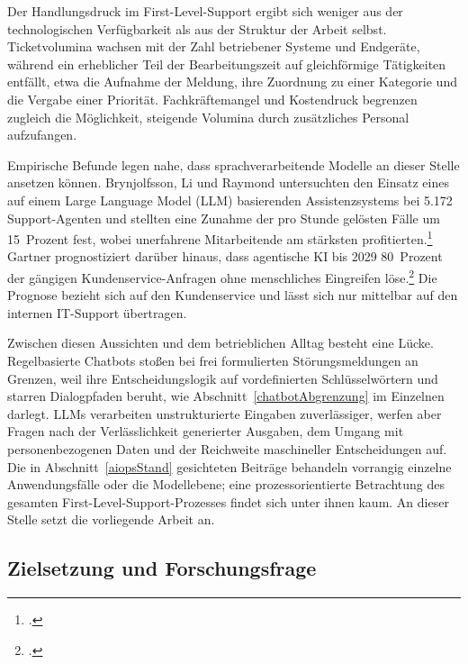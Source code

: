 Der Handlungsdruck im First-Level-Support ergibt sich weniger aus der technologischen Verf\"ugbarkeit als aus der Struktur der Arbeit selbst. Ticketvolumina wachsen mit der Zahl betriebener Systeme und Endger\"ate, w\"ahrend ein erheblicher Teil der Bearbeitungszeit auf gleichf\"ormige T\"atigkeiten entf\"allt, etwa die Aufnahme der Meldung, ihre Zuordnung zu einer Kategorie und die Vergabe einer Priorit\"at. Fachkr\"aftemangel und Kostendruck begrenzen zugleich die M\"oglichkeit, steigende Volumina durch zus\"atzliches Personal aufzufangen.

Empirische Befunde legen nahe, dass sprachverarbeitende Modelle an dieser Stelle ansetzen k\"onnen. Brynjolfsson, Li und Raymond untersuchten den Einsatz eines auf einem Large Language Model (LLM) basierenden Assistenzsystems bei 5.172 Support-Agenten und stellten eine Zunahme der pro Stunde gel\"osten F\"alle um 15~Prozent fest, wobei unerfahrene Mitarbeitende am st\"arksten profitierten.\footcite[Vgl.][hier S.~890]{Brynjolfsson2025} Gartner prognostiziert dar\"uber hinaus, dass agentische KI bis 2029 80~Prozent der g\"angigen Kundenservice-Anfragen ohne menschliches Eingreifen l\"ose.\footcite[Vgl.][o.~S.]{Gartner2025} Die Prognose bezieht sich auf den Kundenservice und l\"asst sich nur mittelbar auf den internen IT-Support \"ubertragen.

Zwischen diesen Aussichten und dem betrieblichen Alltag besteht eine L\"ucke. Regelbasierte Chatbots sto{\ss}en bei frei formulierten St\"orungsmeldungen an Grenzen, weil ihre Entscheidungslogik auf vordefinierten Schl\"usselw\"ortern und starren Dialogpfaden beruht, wie Abschnitt~\ref{chatbotAbgrenzung} im Einzelnen darlegt. LLMs verarbeiten unstrukturierte Eingaben zuverl\"assiger, werfen aber Fragen nach der Verl\"asslichkeit generierter Ausgaben, dem Umgang mit personenbezogenen Daten und der Reichweite maschineller Entscheidungen auf. Die in Abschnitt~\ref{aiopsStand} gesichteten Beitr\"age behandeln vorrangig einzelne Anwendungsf\"alle oder die Modellebene; eine prozessorientierte Betrachtung des gesamten First-Level-Support-Prozesses findet sich unter ihnen kaum. An dieser Stelle setzt die vorliegende Arbeit an.

\subsection{Zielsetzung und Forschungsfrage}
\label{zielsetzung}

